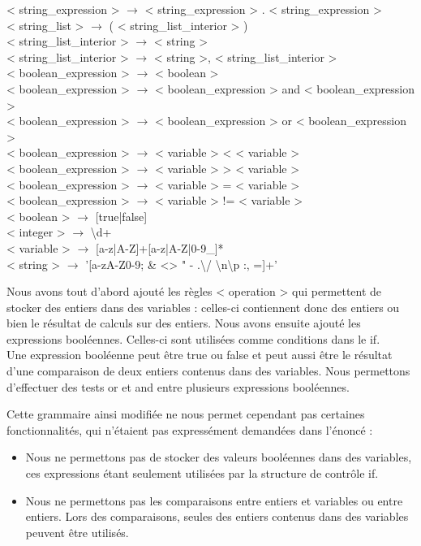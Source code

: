 \documentclass[a4paper,10pt]{article}
\begin{document}
{< string\_expression > $\rightarrow$ < string\_expression > . < string\_expression > \\
< string\_list > $\rightarrow$ ( < string\_list\_interior > ) \\
< string\_list\_interior > $\rightarrow$ < string >\\
< string\_list\_interior > $\rightarrow$ < string >, < string\_list\_interior > \\
< boolean\_expression > $\rightarrow$ < boolean > \\
< boolean\_expression > $\rightarrow$ < boolean\_expression > and < boolean\_expression > \\
< boolean\_expression > $\rightarrow$ < boolean\_expression > or < boolean\_expression > \\
< boolean\_expression > $\rightarrow$ < variable > < < variable >\\
< boolean\_expression > $\rightarrow$ < variable > > < variable >\\
< boolean\_expression > $\rightarrow$ < variable > = < variable >\\
< boolean\_expression > $\rightarrow$ < variable > != < variable >\\
< boolean > $\rightarrow$ [true|false]\\
< integer > $\rightarrow$ \textbackslash d+\\
< variable > $\rightarrow$ [a-z|A-Z]+[a-z|A-Z|0-9\_]*\\
< string > $\rightarrow$ '[a-zA-Z0-9; \& <> " - .\textbackslash / \textbackslash n\textbackslash p :, =]+' \\
}

Nous avons tout d'abord ajouté les règles < operation > qui permettent de stocker des entiers dans des variables : celles-ci contiennent donc des entiers ou bien le résultat
de calculs sur des entiers. Nous avons ensuite ajouté les expressions booléennes. Celles-ci sont utilisées comme conditions dans 
le \textrm{if}.\\
Une expression booléenne peut être \textrm{true} ou \textrm{false} et peut aussi être le résultat d'une comparaison de deux entiers contenus dans des variables. Nous permettons d'effectuer des tests \textrm{or} et \textrm{and} entre plusieurs expressions booléennes.

Cette grammaire ainsi modifiée ne nous permet cependant pas certaines fonctionnalités, qui n'étaient pas expressément demandées dans l'énoncé :
\begin{itemize}
 \item Nous ne permettons pas de stocker des valeurs booléennes dans des variables, ces expressions étant seulement utilisées par la structure de contrôle \textrm{if}. 
 \item Nous ne permettons pas les comparaisons entre entiers et variables ou entre entiers. Lors des comparaisons, seules des entiers contenus dans des variables
 peuvent être utilisés.
\end{itemize}
\end{document}
